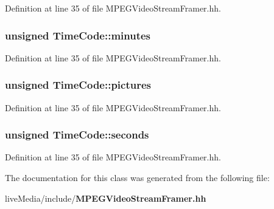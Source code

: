 Definition at line 35 of file M\+P\+E\+G\+Video\+Stream\+Framer.\+hh.

\subsubsection[{minutes}]{\setlength{\rightskip}{0pt plus 5cm}unsigned Time\+Code\+::minutes}\label{classTimeCode_ad1238a0bb81b0ac062f028ac98c16efe}


Definition at line 35 of file M\+P\+E\+G\+Video\+Stream\+Framer.\+hh.

\subsubsection[{pictures}]{\setlength{\rightskip}{0pt plus 5cm}unsigned Time\+Code\+::pictures}\label{classTimeCode_acc6878edf92c14203c7e8759c4f1dedd}


Definition at line 35 of file M\+P\+E\+G\+Video\+Stream\+Framer.\+hh.

\subsubsection[{seconds}]{\setlength{\rightskip}{0pt plus 5cm}unsigned Time\+Code\+::seconds}\label{classTimeCode_a2c355a1edae90cbe5cc0f7e3b9d3fd16}


Definition at line 35 of file M\+P\+E\+G\+Video\+Stream\+Framer.\+hh.



The documentation for this class was generated from the following file\+:\begin{DoxyCompactItemize}
\item 
live\+Media/include/{\bf M\+P\+E\+G\+Video\+Stream\+Framer.\+hh}\end{DoxyCompactItemize}
